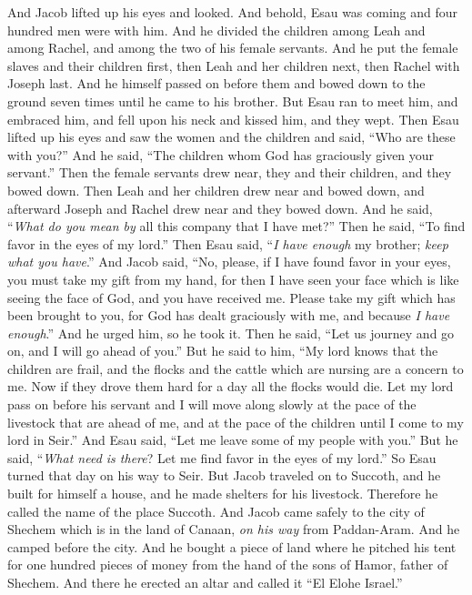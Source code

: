 \begin{biblechapter} %
 And Jacob lifted up his eyes and looked. And behold, Esau was coming and four hundred men were with him. And he divided the children among Leah and among Rachel, and among the two of his female servants.
\verse And he put the female slaves and their children first, then Leah and her children next, then Rachel with Joseph last.
\verse And he himself passed on before them and bowed down to the ground seven times until he came to his brother.
\verse But Esau ran to meet him, and embraced him, and fell upon his neck and kissed him, and they wept.
\verse Then Esau lifted up his eyes and saw the women and the children and said, “Who are these with you?” And he said, “The children whom God has graciously given your servant.”
\verse Then the female servants drew near, they and their children, and they bowed down.
\verse Then Leah and her children drew near and bowed down, and afterward Joseph and Rachel drew near and they bowed down.
\verse And he said, “\textit{What do you mean by} all this company that I have met?” Then he said, “To find favor in the eyes of my lord.”
\verse Then Esau said, “\textit{I have enough} my brother; \textit{keep what you have}.”
\verse And Jacob said, “No, please, if I have found favor in your eyes, you must take my gift from my hand, for then I have seen your face which is like seeing the face of God, and you have received me.
\verse Please take my gift which has been brought to you, for God has dealt graciously with me, and because \textit{I have enough}.” And he urged him, so he took it.
\verse Then he said, “Let us journey and go on, and I will go ahead of you.”
\verse But he said to him, “My lord knows that the children are frail, and the flocks and the cattle which are nursing are a concern to me. Now if they drove them hard for a day all the flocks would die.
\verse Let my lord pass on before his servant and I will move along slowly at the pace of the livestock that are ahead of me, and at the pace of the children until I come to my lord in Seir.”
\verse And Esau said, “Let me leave some of my people with you.” But he said, “\textit{What need is there}? Let me find favor in the eyes of my lord.”
\verse So Esau turned that day on his way to Seir.
\verse But Jacob traveled on to Succoth, and he built for himself a house, and he made shelters for his livestock. Therefore he called the name of the place Succoth.
\verse And Jacob came safely to the city of Shechem which is in the land of Canaan, \textit{on his way} from Paddan-Aram. And he camped before the city.
\verse And he bought a piece of land where he pitched his tent for one hundred pieces of money from the hand of the sons of Hamor, father of Shechem.
\verse And there he erected an altar and called it “El Elohe Israel.”
\end{biblechapter}

